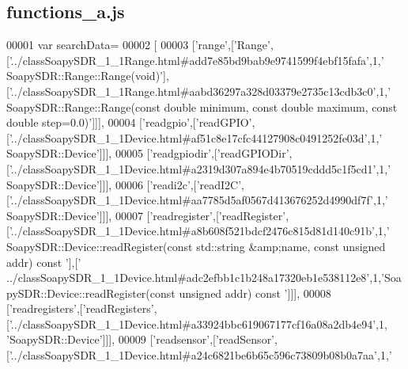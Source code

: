 \subsection{functions\+\_\+a.\+js}
\label{functions__a_8js_source}

\begin{DoxyCode}
00001 var searchData=
00002 [
00003   [\textcolor{stringliteral}{'range'},[\textcolor{stringliteral}{'Range'},[\textcolor{stringliteral}{'../classSoapySDR\_1\_1Range.html#add7e85bd9bab9e9741599f4ebf15fafa'},1,\textcolor{stringliteral}{'
      SoapySDR::Range::Range(void)'}],[\textcolor{stringliteral}{'../classSoapySDR\_1\_1Range.html#aabd36297a328d03379e2735c13cdb3c0'},1,\textcolor{stringliteral}{'
      SoapySDR::Range::Range(const double minimum, const double maximum, const double step=0.0)'}]]],
00004   [\textcolor{stringliteral}{'readgpio'},[\textcolor{stringliteral}{'readGPIO'},[\textcolor{stringliteral}{'../classSoapySDR\_1\_1Device.html#af51c8e17cfc44127908c0491252fe03d'},1,\textcolor{stringliteral}{'
      SoapySDR::Device'}]]],
00005   [\textcolor{stringliteral}{'readgpiodir'},[\textcolor{stringliteral}{'readGPIODir'},[\textcolor{stringliteral}{'../classSoapySDR\_1\_1Device.html#a2319d307a894e4b70519cddd5c1f5cd1'},1,\textcolor{stringliteral}{'
      SoapySDR::Device'}]]],
00006   [\textcolor{stringliteral}{'readi2c'},[\textcolor{stringliteral}{'readI2C'},[\textcolor{stringliteral}{'../classSoapySDR\_1\_1Device.html#aa7785d5af0567d413676252d4990df7f'},1,\textcolor{stringliteral}{'
      SoapySDR::Device'}]]],
00007   [\textcolor{stringliteral}{'readregister'},[\textcolor{stringliteral}{'readRegister'},[\textcolor{stringliteral}{'../classSoapySDR\_1\_1Device.html#a8b608f521bdcf2476c815d81d140c91b'},1,\textcolor{stringliteral}{'
      SoapySDR::Device::readRegister(const std::string &amp;name, const unsigned addr) const '}],[\textcolor{stringliteral}{'
      ../classSoapySDR\_1\_1Device.html#adc2efbb1c1b248a17320eb1e538112e8'},1,\textcolor{stringliteral}{'SoapySDR::Device::readRegister(const unsigned addr)
       const '}]]],
00008   [\textcolor{stringliteral}{'readregisters'},[\textcolor{stringliteral}{'readRegisters'},[\textcolor{stringliteral}{'../classSoapySDR\_1\_1Device.html#a33924bbc619067177cf16a08a2db4e94'},1,\textcolor{stringliteral}{
      'SoapySDR::Device'}]]],
00009   [\textcolor{stringliteral}{'readsensor'},[\textcolor{stringliteral}{'readSensor'},[\textcolor{stringliteral}{'../classSoapySDR\_1\_1Device.html#a24c6821be6b65c596c73809b08b0a7aa'},1,\textcolor{stringliteral}{'
}
\end{DoxyCode}
